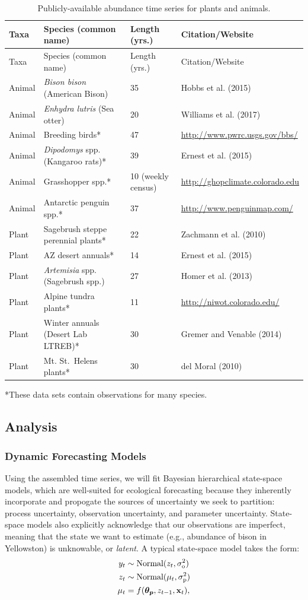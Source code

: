 \documentclass[12pt,]{article}
\begin{document}
\footnotesize

\begin{longtable}[]{@{}llll@{}}
\caption{Publicly-available abundance time series for plants and
animals.}\tabularnewline
\toprule
Taxa & Species (common name) & Length (yrs.) &
Citation/Website\tabularnewline
\midrule
\endfirsthead
\toprule
Taxa & Species (common name) & Length (yrs.) &
Citation/Website\tabularnewline
\midrule
\endhead
Animal & \emph{Bison bison} (American Bison) & 35 & Hobbs et al.
(2015)\tabularnewline
Animal & \emph{Enhydra lutris} (Sea otter) & 20 & Williams et al.
(2017)\tabularnewline
Animal & Breeding birds* & 47 &
\url{http://www.pwrc.usgs.gov/bbs/}\tabularnewline
Animal & \emph{Dipodomys} spp. (Kangaroo rats)* & 39 & Ernest et al.
(2015)\tabularnewline
Animal & Grasshopper spp.* & 10 (weekly census) &
\url{http://ghopclimate.colorado.edu}\tabularnewline
Animal & Antarctic penguin spp.* & 37 &
\url{http://www.penguinmap.com/}\tabularnewline
Plant & Sagebrush steppe perennial plants* & 22 & Zachmann et al.
(2010)\tabularnewline
Plant & AZ desert annuals* & 14 & Ernest et al. (2015)\tabularnewline
Plant & \emph{Artemisia} spp. (Sagebrush spp.) & 27 & Homer et al.
(2013)\tabularnewline
Plant & Alpine tundra plants* & 11 &
\url{http://niwot.colorado.edu/}\tabularnewline
Plant & Winter annuals (Desert Lab LTREB)* & 30 & Gremer and Venable
(2014)\tabularnewline
Plant & Mt. St.~Helens plants* & 30 & del Moral (2010)\tabularnewline
\bottomrule
\end{longtable}

\vspace{-2em}

*These data sets contain observations for many species.

\normalsize

\subsection{Analysis}\subsubsection{Dynamic Forecasting Models}

Using the assembled time series, we will fit Bayesian hierarchical
state-space models, which are well-suited for ecological forecasting
because they inherently incorporate and propogate the sources of
uncertainty we seek to partition: process uncertainty, observation
uncertainty, and parameter uncertainty. State-space models also
explicitly acknowledge that our observations are imperfect, meaning that
the state we want to estimate (e.g., abundance of bison in Yellowston)
is unknowable, or \emph{latent}. A typical state-space model takes the
form: \vspace{-0.5em} \begin{align}
y_t &\sim \text{Normal}(z_t, \sigma^2_{\text{o}}) \\
z_t &\sim \text{Normal}(\mu_t, \sigma^2_{\text{p}}) \\
\mu_t &= f(\boldsymbol{\theta_p},z_{t-1},\bold{x}_t),
\end{align}
\end{document}
